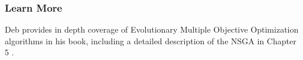 % 
% 
\subsubsection{Learn More}
Deb provides in depth coverage of Evolutionary Multiple Objective Optimization algorithms in his book, including a detailed description of the NSGA in Chapter 5 \cite{Deb2001}.
